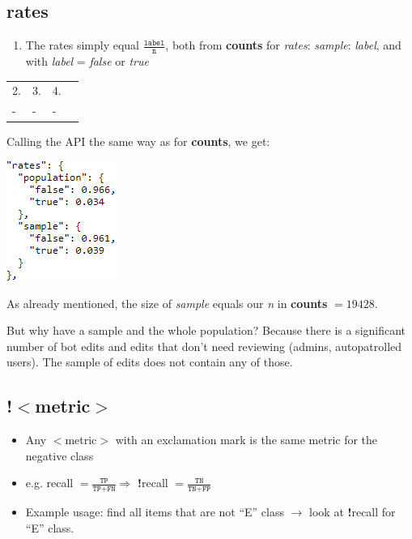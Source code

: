 \documentclass[12pt,a4paper]{article}
\begin{document}
\subsection{rates}
\begin{enumerate}
\item The rates simply equal $\frac{\texttt{label}}{\texttt{n}}$, both from \textbf{counts} for \textit{rates}: \textit{sample}: \textit{label}, and with \textit{label} = \textit{false} or \textit{true}
\end{enumerate}
\begin{tabular}{|l|l|l|l|}
\hline
2. & 3. & 4.\\ 
- & - & - \\ \hline
\end{tabular}
\begin{description}
\item Calling the API the same way as for \textbf{counts}, we get:
\item \includegraphics[scale=0.7]{resources/4/enwikiDamagingRates}
\item As already mentioned, the size of \textit{sample} equals our \textit{n} in \textbf{counts} $= 19428$.
\item But why have a sample and the whole population? Because there is a significant number of bot edits and edits that don't need reviewing (admins, autopatrolled users). The sample of edits does not contain any of those.
\end{description}
%
\subsection{!$<$metric$>$}
\begin{itemize}
\item Any $<$metric$>$ with an exclamation mark is the same metric for the negative class
\item e.g. recall $= \frac{\texttt{TP}}{\texttt{TP} + \texttt{FN}} \Rightarrow$ \textbf{!}recall  $= \frac{\texttt{TN}}{\texttt{TN} + \texttt{FP}}$
\item Example usage: find all items that are not ``E'' class $\rightarrow$ look at \textbf{!}recall for ``E'' class.
\end{itemize}
\end{document}
